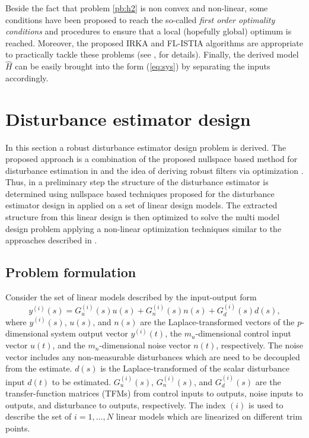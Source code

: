 \documentclass[graybox]{svmult}
\begin{document}
Beside the fact that problem \eqref{pb:h2} is non convex and non-linear, some conditions have been proposed to reach the so-called \emph{first order optimality conditions} and procedures to ensure that a local (hopefully global) optimum is reached. Moreover, the proposed IRKA and FL-ISTIA algorithms are appropriate to practically tackle these problems (see \eg, \cite{GugercinSIAM:2008,VuilleminPhD:2014} for details). %
Finally, the derived  model $\hat H$ can be easily brought into the form (\ref{eq:sys}) by separating the inputs accordingly.









\section{Disturbance estimator design}\label{sec:th}
In this section a robust disturbance estimator design problem is derived. The proposed approach is a combination of the proposed nullspace based method for disturbance estimation in \cite{Ossmann18ccta} and the idea of deriving robust filters via optimization \cite{Varga_11, OssVar_13_eucass}.
Thus, in a preliminary step the structure of the disturbance estimator is determined using nullspace based techniques proposed for the disturbance estimator design in \cite{Ossmann18ccta} applied on a set of linear design models. The extracted  structure from this linear design is then optimized to solve the multi model design problem applying a non-linear optimization techniques similar to the approaches described in \cite{Varga_11, OssVar_13_eucass}.

\subsection{Problem formulation}
Consider the set of linear models described by the input-output form
\begin{equation}\label{eq:sys}
	y^{(i)}(s) = G_u^{(i)}(s) u(s) + G_{n}^{(i)}(s) n(s)  + G_d^{(i)}(s) d(s),
\end{equation}
where $y^{(i)}(s)$, $u(s)$, and $n(s)$  are the Laplace-transformed
vectors of the $p$-dimensional system output vector $y^{(i)}(t)$, the $m_u$-dimensional control input vector $u(t)$, and the $m_{n}$-dimensional noise vector $n(t)$, respectively. The noise vector includes any non-measurable disturbances which are need to be decoupled from the estimate. $d(s)$ is the Laplace-transformed of the scalar  disturbance input $d(t)$ to be estimated.
$G_u^{(i)}(s)$, $G_{n}^{(i)}(s)$, and $G_d^{(i)}(s)$ are the transfer-function matrices (TFMs) from control inputs to  outputs, noise inputs to outputs, and disturbance  to outputs, respectively.  The index ${(i)}$ is used to describe the set of $i=1,\dots, N$ linear models which are linearized on different trim points.
\end{document}
